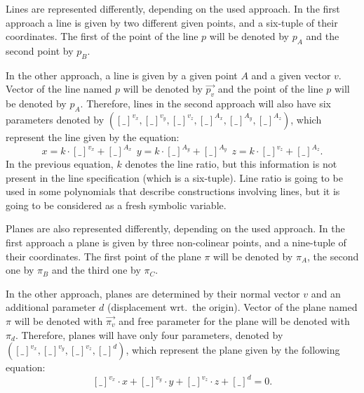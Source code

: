 \documentclass{aicom2e}
\begin{document}
Lines are represented differently, depending on the used approach.  In
the first approach a line is given by two different given points, and
a six-tuple of their coordinates. The first of the point of the line
$p$ will be denoted by $p_A$ and the second point by $p_B$.

In the other approach, a line is given by a given point $A$ and a
given vector $v$. Vector of the line named $p$ will be denoted by
$\overrightarrow{p_v}$ and the point of the line $p$ will be denoted by
$p_A$. Therefore, lines in the second approach will also have six
parameters denoted by
$({[\_]}^{v_x}, {[\_]}^{v_y}, {[\_]}^{v_z}, {[\_]}^{A_x},
{[\_]}^{A_y}, {[\_]}^{A_z})$,
which represent the line given by the equation:
$$x = k\cdot[\_]^{v_x} + {[\_]}^{A_x}\ \ y = k\cdot[\_]^{A_y} +
{[\_]}^{A_y}\ \ z = k\cdot[\_]^{v_z} + {[\_]}^{A_z}.$$
In the previous equation, $k$ denotes the line ratio, but this
information is not present in the line specification (which is a
six-tuple). Line ratio is going to be used in some polynomials that
describe constructions involving lines, but it is going to be
considered as a fresh symbolic variable.

Planes are also represented differently, depending on the used
approach. In the first approach a plane is given by three non-colinear
points, and a nine-tuple of their coordinates. The first point of the
plane $\pi$ will be denoted by $\pi_A$, the second one by $\pi_B$ and
the third one by $\pi_C$.

In the other approach, planes are determined by their normal vector
$v$ and an additional parameter $d$ (displacement wrt.~the
origin). Vector of the plane named $\pi$ will be denoted with
$\overrightarrow{\pi_v}$ and free parameter for the plane will be
denoted with $\pi_d$. Therefore, planes will have only four
parameters, denoted by
$({[\_]}^{v_x}, {[\_]}^{v_y}, {[\_]}^{v_z}, {[\_]}^{d})$, which
represent the plane given by the following equation:
$${[\_]}^{v_x}\cdot x + {[\_]}^{v_y}\cdot y + {[\_]}^{v_z}\cdot z +
{[\_]}^{d} = 0.$$ 
\end{document}
